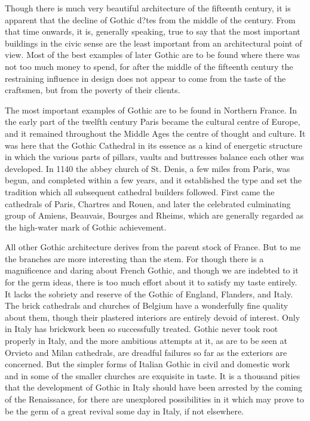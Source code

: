 \documentclass{book}
\begin{document}
Though there is much very beautiful architecture of the fifteenth century, it is apparent that the decline of Gothic d?tes from the middle of the century. From that time onwards, it is, generally speaking, true to say that the most important buildings in the civic sense are the least important from an architectural point of view. Most of the best examples of later Gothic are to be found where there was not too much money to spend, for after the middle of the fifteenth century the restraining influence in design does not appear to come from the taste of the craftsmen, but from the poverty of their clients.

The most important examples of Gothic are to be found in Northern France. In the early part of the twelfth century Paris became the cultural centre of Europe, and it remained throughout the Middle Ages the centre of thought and culture. It was here that the Gothic Cathedral in its essence as a kind of energetic structure in which the various parts of pillars, vaults and buttresses balance each other was developed. In 1140 the abbey church of St. Denis, a few miles from Paris, was begun, and completed within a few years, and it established the type and set the tradition which all subsequent cathedral builders followed. First came the cathedrals of Paris, Chartres and Rouen, and later the celebrated culminating group of Amiens, Beauvais, Bourges and Rheims, which are generally regarded as the high-water mark of Gothic achievement.

All other Gothic architecture derives from the parent stock of France. But to me the branches are more interesting than the stem. For though there is a magnificence and daring about French Gothic, and though we are indebted to it for the germ ideas, there is too much effort about it to satisfy my taste entirely. It lacks the sobriety and reserve of the Gothic of England, Flanders, and Italy. The brick cathedrals and churches of Belgium have a wonderfully fine quality about them, though their plastered interiors are entirely devoid of interest. Only in Italy has brickwork been so successfully treated. Gothic never took root properly in Italy, and the more ambitious attempts at it, as are to be seen at Orvieto and Milan cathedrals, are dreadful failures so far as the exteriors are concerned. But the simpler forms of Italian Gothic in civil and domestic work and in some of the smaller churches are exquisite in taste. It is a thousand pities that the development of Gothic in Italy should have been arrested by the coming of the Renaissance, for there are unexplored possibilities in it which may prove to be the germ of a great revival some day in Italy, if not elsewhere.
\end{document}
